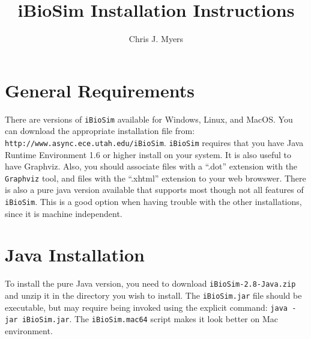 \documentclass[titlepage,11pt]{article}
\title{iBioSim Installation Instructions}
\author{Chris J. Myers}
\begin{document}
\maketitle

  
\tableofcontents

\clearpage
  

\section{General Requirements}

\noindent
There are versions of {\tt iBioSim} available for Windows, Linux, and
MacOS.  You can download the appropriate installation file from:\\
{\tt http://www.async.ece.utah.edu/iBioSim}.
{\tt iBioSim} requires that you have 
Java Runtime Environment 1.6
or higher install on your system.  It is also useful to have 
Graphviz.
Also, you should associate files with a ``.dot'' extension with the 
{\tt Graphviz} tool, and files with the ``.xhtml'' extension to your
web browswer.  There is also a pure java version available that
supports most though not all features of {\tt iBioSim}.  This is a good option when having trouble with the other installations, since it is machine independent.

\section{Java Installation}

\noindent
To install the pure Java version, you need to download {\tt iBioSim-2.8-Java.zip} and unzip it in the directory you wish to install.  The {\tt iBioSim.jar} file should be executable, but may require being invoked using the explicit command: {\tt java -jar iBioSim.jar}.
The {\tt iBioSim.mac64} script makes it look better on Mac environment.
\end{document}
